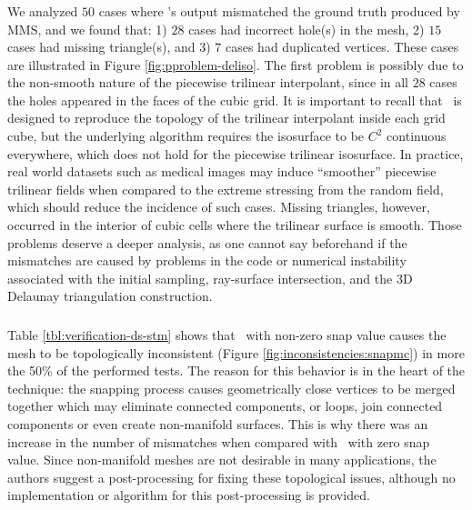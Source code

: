 \subsubsection{\deliso}
\label{sec:consistency:deliso}
We analyzed $50$ cases where \deliso's output mismatched the ground
truth produced by MMS, and we found that: 1) $28$ cases had incorrect
hole(s) in the mesh, 2) $15$ cases had missing triangle(s), and 3) $7$
cases had duplicated vertices.  These cases are illustrated in Figure
\ref{fig:pproblem-deliso}.  The first problem is possibly due to the
non-smooth nature of the piecewise trilinear interpolant, since in all
$28$ cases the holes appeared in the faces of the cubic grid. It is
important to recall that \deliso\ is designed to reproduce the
topology of the trilinear interpolant inside each grid cube, but the
underlying algorithm requires the isosurface to be $C^2$ continuous
everywhere, which does not hold for the piecewise trilinear
isosurface.
In practice, real world datasets such as medical images may induce
``smoother'' piecewise trilinear fields when compared to the extreme
stressing from the random field, which should reduce the incidence of
such cases. Missing triangles, however, occurred in the interior of
cubic cells where the trilinear surface is smooth.
Those problems deserve a deeper analysis, as one cannot say beforehand
if the mismatches are caused by problems in the code or numerical
instability
associated with the initial sampling, ray-surface intersection, and the
3D Delaunay triangulation construction.

\subsubsection{\snapmc}

Table \ref{tbl:verification-ds-stm} shows that \snapmc\ with non-zero snap value
causes the mesh to be topologically inconsistent (Figure 
\ref{fig:inconsistencies:snapmc}) in more the 50\% of the performed tests. 
The reason for this behavior is in the heart of the technique: the snapping process 
causes geometrically close vertices to be merged together 
which may eliminate connected components, or loops, join connected
components or even create non-manifold surfaces. This is why there was an increase
in the number of mismatches when compared with \snapmc\ with zero snap value.
Since non-manifold meshes are not desirable in many applications, the authors 
suggest a post-processing for fixing these topological issues, although no implementation
or algorithm for this post-processing is provided.

